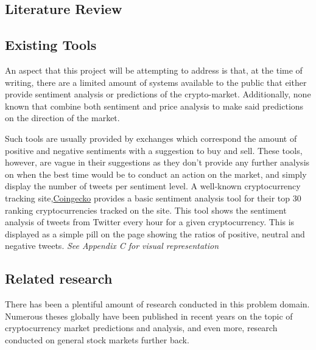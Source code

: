 \documentclass[oneside, 10pt]{article}
\begin{document}
	
	\newpage
	
	\begin{center}
		\section{Literature Review}\label{literature}
	\end{center}
		\subsection{Existing Tools}
		An aspect that this project will be attempting to address is that, at the time of writing, there are a limited amount of systems available to the public that either provide sentiment analysis or predictions of the crypto-market. Additionally, none known that combine both sentiment and price analysis to make said predictions on the direction of the market.
		
		Such tools are usually provided by exchanges which correspond the amount of positive and negative sentiments with a suggestion to buy and sell. These tools, however, are vague in their suggestions as they don't provide any further analysis on when the best time would be to conduct an action on the market, and simply display the number of tweets per sentiment level. A well-known cryptocurrency tracking site,\href{https://www.coingecko.com}{Coingecko} provides a basic sentiment analysis tool for their top 30 ranking cryptocurrencies tracked on the site. This tool shows the sentiment analysis of tweets from Twitter every hour for a given cryptocurrency. This is displayed as a simple pill on the page showing the ratios of positive, neutral and negative tweets. \textit{See Appendix C for visual representation}
			
		\subsection{Related research}
		
		There has been a plentiful amount of research conducted in this problem domain. Numerous theses globally have been published in recent years on the topic of cryptocurrency market predictions and analysis, and even more, research conducted on general stock markets further back. 
		
\end{document}
